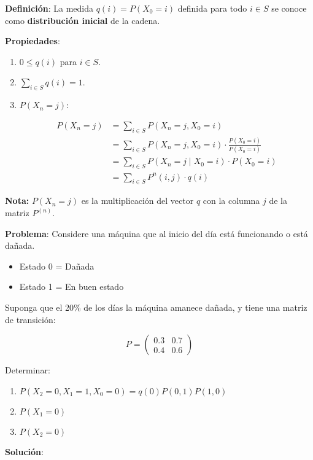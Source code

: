 \documentclass[12pt,a4paper]{article}
\begin{document}
\textbf{Definición}: La medida $q(i) = P(X_0 = i)$ definida para todo $i \in S$ se conoce como \textbf{distribución inicial} de la cadena.

\textbf{Propiedades}:

\begin{enumerate}
    \item $0 \leq q(i)$ para $i \in S$.
    \item $\sum_{i \in S} q(i) = 1$.
    \item $P(X_n = j)$:

    \begin{align*}
    P(X_n = j) &= \sum_{i \in S} P(X_n = j, X_0 = i) \\
    &= \sum_{i \in S} P(X_n = j, X_0 = i) \cdot \frac{P(X_0 = i)}{P(X_0 = i)} \\
    &= \sum_{i \in S} P(X_n = j \mid X_0 = i) \cdot P(X_0 = i) \\
    &= \sum_{i \in S} P^n(i,j) \cdot q(i)
    \end{align*}
\end{enumerate}

\textbf{Nota:} $P(X_n = j)$ es la multiplicación del vector $q$ con la columna $j$ de la matriz $P^{(n)}$.

\textbf{Problema}: Considere una máquina que al inicio del día está funcionando o está dañada.

\begin{itemize}
    \item Estado 0 = Dañada
    \item Estado 1 = En buen estado
\end{itemize}

Suponga que el 20\% de los días la máquina amanece dañada, y tiene una matriz de transición:

\begin{equation*}
P = \begin{pmatrix}
0.3 & 0.7 \\
0.4 & 0.6
\end{pmatrix}
\end{equation*}

Determinar:
\begin{enumerate}
    \item $P(X_2 = 0, X_1 = 1, X_0 = 0) = q(0) P(0,1) P(1,0)$
    \item $P(X_1 = 0)$
    \item $P(X_2 = 0)$
\end{enumerate}

\textbf{Solución}:
\end{document}
